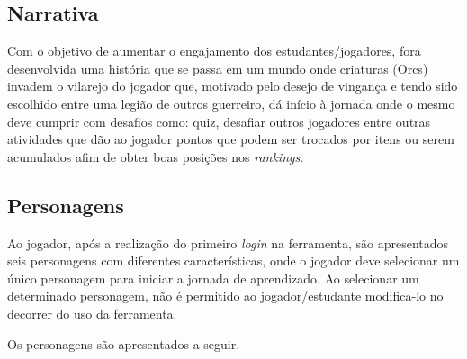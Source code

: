 \subsection{Narrativa}

Com o objetivo de aumentar o engajamento dos estudantes/jogadores, fora desenvolvida uma história que se passa em um mundo 
onde criaturas (Orcs) invadem o vilarejo do jogador que, motivado pelo desejo de vingança e tendo sido escolhido entre uma legião 
de outros guerreiro, dá início à jornada onde o mesmo deve cumprir com desafios como: quiz, desafiar outros jogadores entre outras
atividades que dão ao jogador pontos que podem ser trocados por itens ou serem acumulados afim de obter boas posições nos \textit{rankings}.

\subsection{Personagens}

Ao jogador, após a realização do primeiro \textit{login} na ferramenta, são apresentados seis personagens com diferentes características, onde o jogador
deve selecionar um único personagem para iniciar a jornada de aprendizado. Ao selecionar um determinado personagem, não é permitido ao jogador/estudante 
modifica-lo no decorrer do uso da ferramenta.

Os personagens são apresentados a seguir.

\pagebreak

